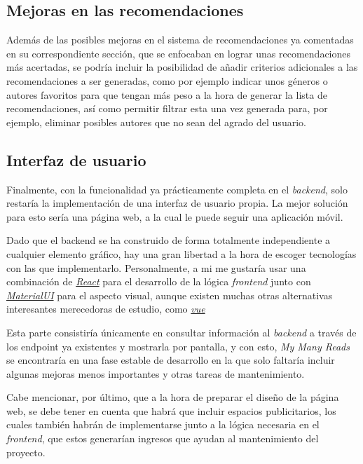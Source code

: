 \subsection{Mejoras en las recomendaciones}

Además de las posibles mejoras en el sistema de recomendaciones ya comentadas en su correspondiente sección, que se enfocaban en lograr unas recomendaciones más acertadas, se podría incluir la posibilidad de añadir criterios adicionales a las recomendaciones a ser generadas, como por ejemplo indicar unos géneros o autores favoritos para que tengan más peso a la hora de generar la lista de recomendaciones, así como permitir filtrar esta una vez generada para, por ejemplo, eliminar posibles autores que no sean del agrado del usuario.

\subsection{Interfaz de usuario}

Finalmente, con la funcionalidad ya prácticamente completa en el \textit{backend}, solo restaría la implementación de una interfaz de usuario propia. La mejor solución para esto sería una página web, a la cual le puede seguir una aplicación móvil.

Dado que el backend se ha construido de forma totalmente independiente a cualquier elemento gráfico, hay una gran libertad a la hora de escoger tecnologías con las que implementarlo. Personalmente, a mi me gustaría usar una combinación de \href{https://es.react.dev/}{\textit{React}} para el desarrollo de la lógica \textit{frontend} junto con \href{https://mui.com/}{\textit{MaterialUI}} para el aspecto visual, aunque existen muchas otras alternativas interesantes merecedoras de estudio, como \href{https://vuejs.org/}{\textit{vue}}

Esta parte consistiría únicamente en consultar información al \textit{backend} a través de los endpoint ya existentes y mostrarla por pantalla, y con esto, \textit{My Many Reads} se encontraría en una fase estable de desarrollo en la que solo faltaría incluir algunas mejoras menos importantes y otras tareas de mantenimiento.

Cabe mencionar, por último, que a la hora de preparar el diseño de la página web, se debe tener en cuenta que habrá que incluir espacios publicitarios, los cuales también habrán de implementarse junto a la lógica necesaria en el \textit{frontend}, que estos generarían ingresos que ayudan al mantenimiento del proyecto.
